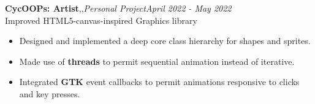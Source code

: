 \textbf{CycOOPs: Artist}\sep\cpp\sep{\it Personal Project}\hfill{\sl \small April 2022 - May 2022}\\
\vspace{-8pt}
\emerrow Improved HTML5-canvas-inspired Graphics library 
\begin{itemize}[itemsep = -1.7 mm, leftmargin=*]
\item Designed and implemented a deep core class hierarchy for shapes and sprites.
\item Made use of {\bf threads} to permit sequential animation instead of iterative.
\item Integrated {\bf GTK} event callbacks to permit animations responsive to clicks and key presses.
\end{itemize}
